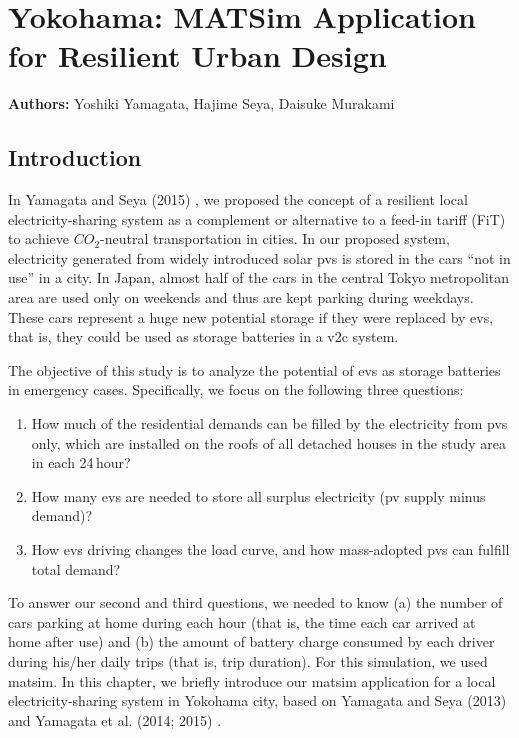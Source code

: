 \chapter{Yokohama: MATSim Application for Resilient Urban Design}
\label{ch:yokohama}
\hfill \textbf{Authors:} Yoshiki Yamagata, Hajime Seya, Daisuke Murakami

\section{Introduction}
In Yamagata and Seya (2015) \citet[][]{}, we proposed the concept of a resilient local electricity-sharing system as a complement or alternative to a feed-in tariff (FiT) to achieve $CO_2$-neutral transportation in cities. In our proposed system, electricity generated from widely introduced solar \glspl{pv}
is stored in the cars ``not in use'' in a city. In Japan, almost half of the cars in the central Tokyo metropolitan area are used only on weekends and thus are kept parking during weekdays. These cars represent a huge new potential storage if they were replaced by \glspl{ev}, that is, they could be used as storage batteries in a \gls{v2c} system. 

The objective of this study is to analyze the potential of \glspl{ev} as storage batteries in emergency cases. Specifically, we focus on the following three questions: 
\begin{enumerate}\styleEnumerate
\item How much of the residential demands can be filled by the electricity from \glspl{pv} only, which are installed on the roofs of all detached houses in the study area in each 24\,hour? 
\item How many \glspl{ev} are needed to store all surplus electricity (\gls{pv} supply minus demand)?
\item How \glspl{ev} driving changes the load curve, and how mass-adopted \glspl{pv} can fulfill total demand? 
\end{enumerate}
To answer our second and third questions, we needed to know (a) the number of cars parking at home during each hour (that is, the time each car arrived at home after use) and (b) the amount of battery charge consumed by each driver during his/her daily trips (that is, trip duration). For this simulation, we used \gls{matsim}. In this chapter, we briefly introduce our \gls{matsim} application for a local electricity-sharing system in Yokohama city, based on Yamagata and Seya (2013) and Yamagata et al. (2014; 2015) \citet[][]{}.


